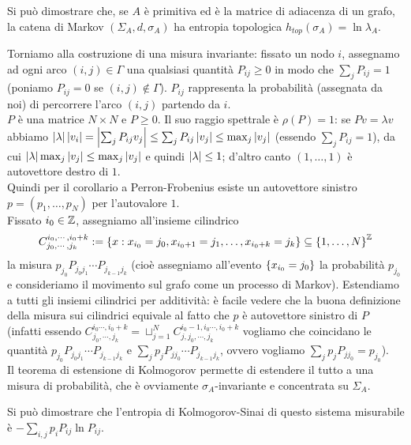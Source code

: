 Si può dimostrare che, se $A$ è primitiva ed è la matrice di adiacenza di un grafo, la catena di Markov
$(\Sigma_A,d,\sigma_A)$ ha entropia topologica $h_{top}(\sigma_A)=\ln \lambda_A$.

Torniamo alla costruzione di una misura invariante: fissato un nodo $i$, assegnamo ad ogni arco $(i,j)\in\Gamma$
una qualsiasi quantità $P_{ij}\ge 0$ in modo che $\sum_j P_{ij}=1$ (poniamo $P_{ij}=0$ se $(i,j)\nin\Gamma$).
$P_{ij}$ rappresenta la probabilità (assegnata da noi) di percorrere l'arco $(i,j)$ partendo da $i$. \\
$P$ è una matrice $N\times N$ e $P\ge 0$. Il suo raggio spettrale è $\rho(P)=1$:
se $Pv=\lambda v$ abbiamo $\left|\lambda\right|\left|v_i\right|=\left|\sum_j P_{ij}v_j\right|\le\sum_j P_{ij}\left|v_j\right|\le\max_j\left|v_j\right|$
(essendo $\sum_j P_{ij}=1$), da cui $\left|\lambda\right|\max_j\left|v_j\right|\le\max_j\left|v_j\right|$ e quindi $\left|\lambda\right|\le 1$;
d'altro canto $(1,\dots,1)$ è autovettore destro di $1$. \\
Quindi per il corollario a Perron-Frobenius esiste un autovettore sinistro
$p=(p_1,\dots,p_N)$ per l'autovalore $1$. \\
Fissato $i_0\in\mathbb{Z}$, assegniamo all'insieme cilindrico
\[ C^{i_0,\cdots, i_0+k}_{j_0,\cdots, j_k}:=\left\{x:x_{i_0}=j_0,x_{i_0+1}=j_1,\dots,x_{i_0+k}=j_k\right\}\subseteq\left\{1,\dots,N\right\}^{\mathbb{Z}} \]
la misura $p_{j_0}P_{j_0j_1}\cdots P_{j_{k-1}j_k}$
(cioè assegniamo all'evento $\left\{x_{i_0}=j_0\right\}$ la probabilità
$p_{j_0}$ e consideriamo il movimento sul grafo come un processo di Markov).
Estendiamo a tutti gli insiemi cilindrici per additività: è facile vedere che la buona definizione della misura sui cilindrici
equivale al fatto che $p$ è autovettore sinistro di $P$
(infatti essendo $C^{i_0\cdots, i_0+k}_{j_0,\cdots, j_k}=\sqcup_{j=1}^N C^{i_0-1,i_0\cdots, i_0+k}_{j,j_0,\cdots, j_k}$
vogliamo che coincidano le quantità  $p_{j_0}P_{j_0 j_1}\cdots P_{j_{k-1}j_k}$ e $\sum_j p_jP_{jj_0}\cdots P_{j_{k-1}j_k}$,
ovvero vogliamo $\sum_j p_j P_{jj_0}=p_{j_0}$). \\
Il teorema di estensione di Kolmogorov permette di estendere il tutto a una misura di probabilità, che è ovviamente $\sigma_A$-invariante
e concentrata su $\Sigma_A$.

Si può dimostrare che l'entropia di Kolmogorov-Sinai di questo sistema misurabile è $-\sum_{i,j}p_iP_{ij}\ln P_{ij}$.

